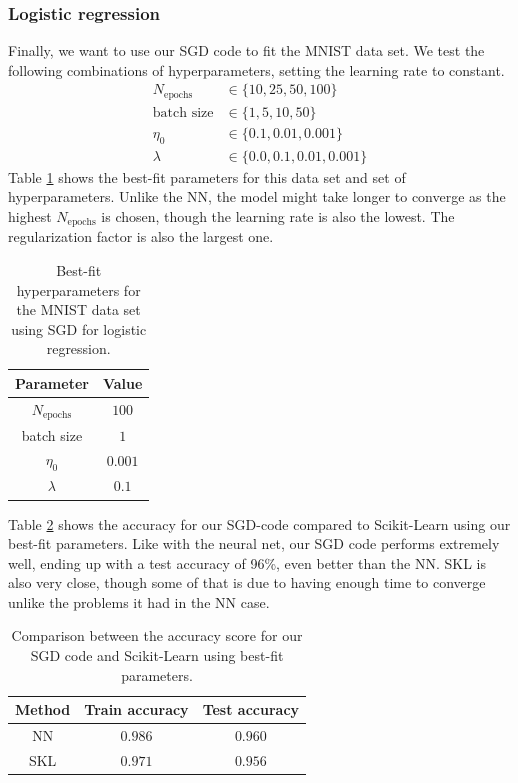 \documentclass[a4paper]{article}
\newcommand{\Nepochs}{N_{\text{epochs}}}
\begin{document}
\subsubsection{Logistic regression}
Finally, we want to use our SGD code to fit the MNIST data set. We test the following combinations of hyperparameters, setting the learning rate to constant.
\begin{align*}
	N_{\text{epochs}} &\in \{10, 25, 50, 100\}\\
	\text{batch size} &\in \{1, 5, 10, 50\}\\
	\eta_0 &\in \{0.1, 0.01, 0.001\}\\
	\lambda &\in \{0.0, 0.1, 0.01, 0.001\}
\end{align*}
Table \ref{tab:sgd_best_fit_mnist} shows the best-fit parameters for this data set and set of hyperparameters. Unlike the NN, the model might take longer to converge as the highest $\Nepochs$ is chosen, though the learning rate is also the lowest. The regularization factor is also the largest one.
\begin{table}[H]
  \centering
  \caption{Best-fit hyperparameters for the MNIST data set using SGD for logistic regression.}
  \label{tab:sgd_best_fit_mnist}
  \begin{tabular}{c|c}
    \hline\hline
    Parameter & Value\\\hline
    $\Nepochs$ &  $100$\\
    batch size &  $1$\\
    $\eta_0$ & $0.001$ \\
    $\lambda$ & $0.1$
    \end{tabular}
\end{table}
Table \ref{tab:sgd_mnist_accuracy} shows the accuracy for our SGD-code compared to Scikit-Learn using our best-fit parameters. Like with the neural net, our SGD code performs extremely well, ending up with a test accuracy of 96\%, even better than the NN. SKL is also very close, though some of that is due to having enough time to converge unlike the problems it had in the NN case.
\begin{table}[H]
  \centering
  \caption{Comparison between the accuracy score for our SGD code and Scikit-Learn using best-fit parameters.}
  \label{tab:sgd_mnist_accuracy}
  \begin{tabular}{c|c|c}
    \hline\hline
    Method & Train accuracy & Test accuracy\\\hline
	NN & $0.986$ & $0.960$\\
	SKL & $0.971$ & $0.956$
    \end{tabular}
\end{table}
\end{document}
